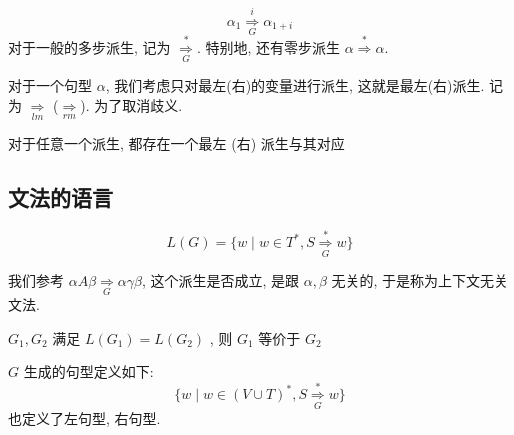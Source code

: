 \documentclass[../main_part1.tex]{subfiles}
\begin{document}
\begin{exam}[派生的例子]
\end{exam}

\begin{definition}[多步派生]
	\begin{equation}
		\alpha_{1} \overset{i}{\underset{G}{\Rightarrow}} \alpha _{1 + i}
	\end{equation}
	对于一般的多步派生, 记为 \(\overset{*}{\underset{G}{\Rightarrow}}\). 特别地, 还有零步派生 \(\alpha \overset{*}{\Rightarrow}\alpha\).
\end{definition}

\begin{definition}
	对于一个句型 \(\alpha\), 我们考虑只对最左(右)的变量进行派生, 这就是最左(右)派生. 记为 \(\underset{lm}{\Rightarrow}\) (\(\underset{rm}{\Rightarrow}\)). 为了取消歧义. 
\end{definition}
\begin{thm}
对于任意一个派生, 都存在一个最左 (右) 派生与其对应
\end{thm}

\subsection{文法的语言}
\begin{definition}[语言]
\begin{equation}
	L (G) =  \{ w \mid w \in T ^{*} , S \overset{*}{\underset{G}{\Rightarrow}} w \}
\end{equation}
\end{definition}

\begin{remark}[为什么称为是上下文无关文法]
	我们参考 \(\alpha A\beta \underset{G}{\Rightarrow}\alpha\gamma\beta\), 这个派生是否成立, 是跟 \(\alpha ,\beta\) 无关的, 于是称为上下文无关文法.
\end{remark}

\begin{definition}[等价性]
	\(G_{1} , G_{2}\) 满足 \(L (G _{1} )  =  L (G _{2} ) \) , 则 \(G_{1} \) 等价于 \(G_{2}\)
\end{definition}

\begin{definition}
	\(G\) 生成的句型定义如下: 
	\begin{equation}
		\{ w \mid w \in (V \cup T ) ^{*} , S \overset{*}{\underset{G}{\Rightarrow}} w \}
	\end{equation}
	也定义了左句型, 右句型.
\end{definition}
\end{document}
